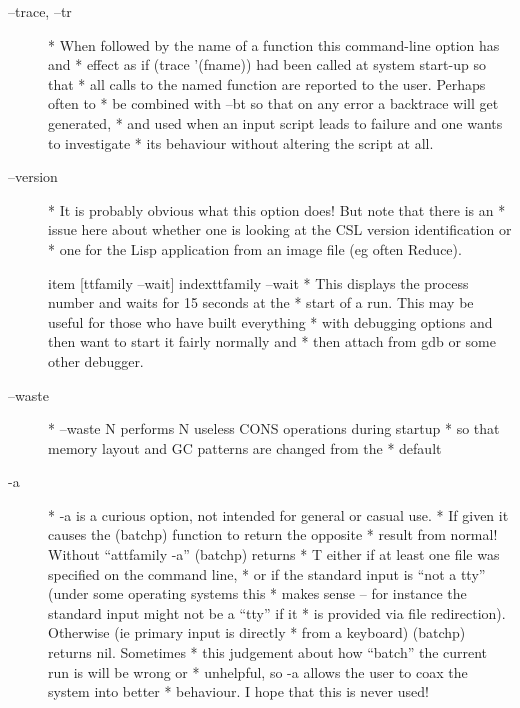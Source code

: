 \documentclass[a4paper,11pt]{article}
\begin{document}
\begin{description}
\item [{\ttfamily --trace, --tr}] 
          * When followed by the name of a function this command-line option has and
          * effect as if (trace '(fname)) had been called at system start-up so that
          * all calls to the named function are reported to the user. Perhaps often to
          * be combined with --bt so that on any error a backtrace will get generated,
          * and used when an input script leads to failure and one wants to investigate
          * its behaviour without altering the script at all.

\item [{\ttfamily --version}] 
          * It is probably obvious what this option does! But note that there is an
          * issue here about whether one is looking at the CSL version identification or
          * one for the Lisp application from an image file (eg often Reduce).

item [{ttfamily --wait}] index{{ttfamily --wait}}
          * This displays the process number and waits for 15 seconds at the
          * start of a run. This may be useful for those who have built everything
          * with debugging options and then want to start it fairly normally and
          * then attach from gdb or some other debugger.

\item [{\ttfamily --waste}] 
          * --waste N performs N useless CONS operations during startup
          * so that memory layout and GC patterns are changed from the
          * default

\item [{\ttfamily -a}] 
          * {\ttfamily -a} is a curious option, not intended for general or casual use.
          * If given it causes the {\ttfamily (batchp)} function to return the opposite
          * result from normal!  Without ``{attfamily -a}'' {\ttfamily (batchp)} returns
          * {\ttfamily T} either if at least one file was specified on the command line,
          * or if the standard input is ``not a tty'' (under some operating systems this
          * makes sense -- for instance the standard input might not be a ``tty'' if it
          * is provided via file redirection).  Otherwise (ie primary input is directly
          * from a keyboard) {\ttfamily (batchp)} returns {\ttfamily nil}.  Sometimes
          * this judgement about how ``batch'' the current run is will be wrong or
          * unhelpful, so {\ttfamily -a} allows the user to coax the system into better
          * behaviour.  I hope that this is never used!


\end{description}
\end{document}
